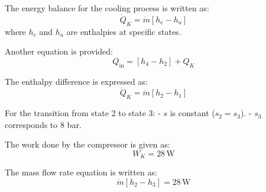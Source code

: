 The energy balance for the cooling process is written as:  
\[
\dot{Q}_K = \dot{m} \left[ h_e - h_a \right]
\]  
where \( h_e \) and \( h_a \) are enthalpies at specific states.  

Another equation is provided:  
\[
Q_{\text{in}} = \left[ h_4 - h_2 \right] + Q_K
\]  

The enthalpy difference is expressed as:  
\[
\dot{Q}_K = \dot{m} \left[ h_2 - h_1 \right]
\]  

For the transition from state 2 to state 3:  
- \( s \) is constant (\( s_2 = s_3 \)).  
- \( s_3 \) corresponds to 8 bar.  

The work done by the compressor is given as:  
\[
W_K = 28 \, \text{W}
\]  

The mass flow rate equation is written as:  
\[
\dot{m} \left[ h_2 - h_3 \right] = 28 \, \text{W}
\]